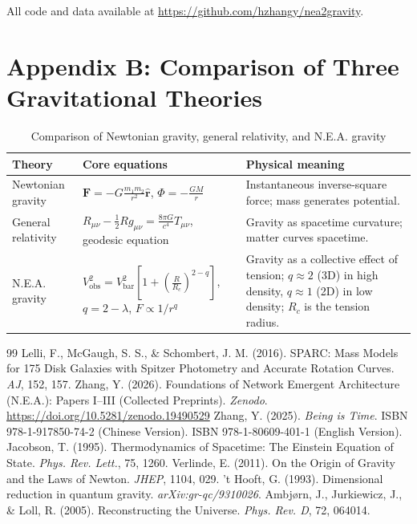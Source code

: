 \documentclass[12pt,a4paper]{article}
\begin{document}
All code and data available at \url{https://github.com/hzhangy/nea2gravity}.

\section*{Appendix B: Comparison of Three Gravitational Theories}
\begin{table}[htbp]
\centering
\caption{Comparison of Newtonian gravity, general relativity, and N.E.A. gravity}
\label{tab:gravity_compare}
\begin{tabular}{p{} p{} p{}}
\toprule
\textbf{Theory} & \textbf{Core equations} & \textbf{Physical meaning} \\
\midrule
Newtonian gravity & $\mathbf{F} = -G\frac{m_1m_2}{r^2}\hat{\mathbf{r}}$, $\Phi = -\frac{GM}{r}$ & Instantaneous inverse‑square force; mass generates potential. \\
General relativity & $R_{\mu\nu}-\frac12Rg_{\mu\nu}=\frac{8\pi G}{c^4}T_{\mu\nu}$, geodesic equation & Gravity as spacetime curvature; matter curves spacetime. \\
N.E.A. gravity & $V_{\text{obs}}^2 = V_{\text{bar}}^2\left[1+\left(\frac{R}{R_c}\right)^{2-q}\right]$, $q=2-\lambda$, $F\propto 1/r^{q}$ & Gravity as a collective effect of tension; $q\approx2$ (3D) in high density, $q\approx1$ (2D) in low density; $R_c$ is the tension radius. \\
\bottomrule
\end{tabular}
\end{table}

\clearpage

\begin{thebibliography}{99}
 Lelli, F., McGaugh, S. S., \& Schombert, J. M. (2016). SPARC: Mass Models for 175 Disk Galaxies with Spitzer Photometry and Accurate Rotation Curves. \textit{AJ}, 152, 157.
 Zhang, Y. (2026). Foundations of Network Emergent Architecture (N.E.A.): Papers I–III (Collected Preprints). \textit{Zenodo}. \url{https://doi.org/10.5281/zenodo.19490529}
 Zhang, Y. (2025). \textit{Being is Time}. ISBN 978-1-917850-74-2 (Chinese Version). ISBN 978-1-80609-401-1 (English Version).
 Jacobson, T. (1995). Thermodynamics of Spacetime: The Einstein Equation of State. \textit{Phys. Rev. Lett.}, 75, 1260.
 Verlinde, E. (2011). On the Origin of Gravity and the Laws of Newton. \textit{JHEP}, 1104, 029.
 't Hooft, G. (1993). Dimensional reduction in quantum gravity. \textit{arXiv:gr-qc/9310026}.
 Ambjørn, J., Jurkiewicz, J., \& Loll, R. (2005). Reconstructing the Universe. \textit{Phys. Rev. D}, 72, 064014.
\end{thebibliography}
\end{document}
